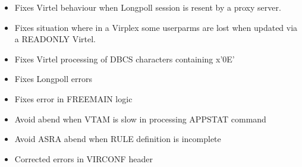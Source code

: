 \documentclass[letterpaper,10pt,english]{sphinxmanual}
\begin{document}
\begin{itemize}
\item {} 
Fixes Virtel behaviour when Longpoll session is resent by a proxy server.

\end{itemize}

\begin{itemize}
\item {} 
Fixes situation where in a Virplex some userparms are lost when updated via a READONLY Virtel.

\end{itemize}

\begin{itemize}
\item {} 
Fixes Virtel processing of DBCS characters containing x’0E’

\end{itemize}

\begin{itemize}
\item {} 
Fixes Longpoll errors

\end{itemize}

\begin{itemize}
\item {} 
Fixes error in FREEMAIN logic

\end{itemize}

\begin{itemize}
\item {} 
Avoid abend when VTAM is slow in processing APPSTAT command

\end{itemize}

\begin{itemize}
\item {} 
Avoid ASRA abend when RULE definition is incomplete

\end{itemize}

\begin{itemize}
\item {} 
Corrected errors in VIRCONF header

\end{itemize}
\end{document}
